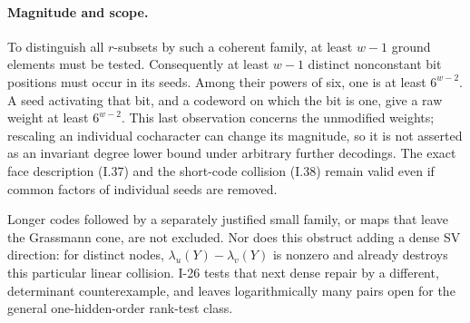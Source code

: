\paragraph{Magnitude and scope.}
To distinguish all $r$-subsets by such a coherent family,
at least $w-1$ ground elements must be tested.  Consequently
at least $w-1$ distinct nonconstant bit positions must occur
in its seeds.  Among their powers of six, one is at least
$6^{w-2}$.  A seed activating that bit, and a codeword on
which the bit is one, give a raw weight at least $6^{w-2}$.
This last observation concerns the unmodified weights;
rescaling an individual cocharacter can change its magnitude,
so it is not asserted as an invariant degree lower bound
under arbitrary further decodings.  The exact face
description (I.37) and the short-code collision (I.38) remain
valid even if common factors of individual seeds are removed.

Longer codes followed by a separately justified small family,
or maps that leave the Grassmann cone, are not excluded.
Nor does this obstruct adding a dense SV direction: for
distinct nodes, $\lambda_u(Y)-\lambda_v(Y)$ is nonzero and
already destroys this particular linear collision.  I-26
tests that next dense repair by a different, determinant
counterexample, and leaves logarithmically many pairs open
for the general one-hidden-order rank-test class.
